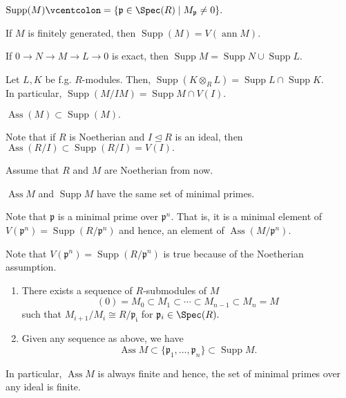 \documentclass[12pt]{article}	%
\DeclareMathOperator{\Ass}{Ass}
\DeclareMathOperator{\Supp}{Supp}
\DeclareMathOperator{\ann}{ann}
\begin{document}
\begin{defn}%
	$\Supp(M) \vcentcolon= \{\mathfrak{p} \in \Spec(R) \mid M_{\mathfrak{p}} \neq 0\}.$
\end{defn}
\begin{prop}
	If $M$ is finitely generated, then $\Supp(M) = V(\ann M).$
\end{prop}
\begin{prop}
	If $0 \to N \to M \to L \to 0$ is exact, then $\Supp M = \Supp N \cup \Supp L.$
\end{prop}
\begin{prop}
	Let $L, K$ be f.g. $R$-modules. Then, $\Supp(K \otimes_R L) = \Supp L \cap \Supp K.$\\
	In particular, $\Supp(M/IM) = \Supp M \cap V(I).$
\end{prop}

\begin{prop}
	$\Ass(M) \subset \Supp(M).$
\end{prop}
Note that if $R$ is Noetherian and $I \unlhd R$ is an ideal, then $\Ass(R/I) \subset \Supp(R/I) = V(I).$

\begin{disc}
	Assume that $R$ and $M$ are Noetherian from now.
\end{disc}

\begin{prop}
	$\Ass M$ and $\Supp M$ have the same set of minimal primes.
\end{prop}
\begin{rem}
	Note that $\mathfrak{p}$ is a minimal prime over $\mathfrak{p}^n.$ That is, it is a minimal element of $V(\mathfrak{p}^n) = \Supp(R/\mathfrak{p}^n)$ and hence, an element of $\Ass(M/\mathfrak{p}^n).$

	Note that $V(\mathfrak{p}^n) = \Supp(R/\mathfrak{p}^n)$ is true because of the Noetherian assumption.
\end{rem}

\begin{thm}
	\begin{enumerate}
		\item There exists a sequence of $R$-submodules of $M$
		\begin{equation*} 
			(0) = M_0 \subset M_1 \subset \cdots \subset M_{n-1} \subset M_n = M
		\end{equation*}
		such that $M_{i+1}/M_i \cong R/\mathfrak{p_i}$ for $\mathfrak{p}_i \in \Spec(R).$
		\item Given any sequence as above, we have
		\begin{equation*} 
			\Ass M \subset \{\mathfrak{p}_1, \ldots, \mathfrak{p}_n\} \subset \Supp M.
		\end{equation*}
	\end{enumerate}
	In particular, $\Ass M$ is always finite and hence, the set of minimal primes over any ideal is finite.
\end{thm}
\end{document}
